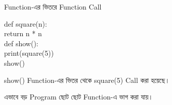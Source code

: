 \begin{codeoutputbox}{Function-এর ভিতরে Function Call}

\noindent
\begin{minipage}[t]{0.55\linewidth}
\codeheading

\begin{english}
\ttfamily
def square(n):\\
\hspace*{4mm}return n * n\\[0.5mm]
def show():\\
\hspace*{4mm}print(square(5))\\[0.5mm]
show()
\end{english}

\end{minipage}
\hfill
\begin{minipage}[t]{0.41\linewidth}
\outputheading

\begin{center}
\textenglish{}
\end{center}

\textenglish{\ttfamily show()}
Function-এর ভিতর থেকে
\textenglish{\ttfamily square(5)}
Call করা হয়েছে।

এভাবে বড় Program ছোট ছোট Function-এ ভাগ করা যায়।

\end{minipage}

\end{codeoutputbox}



